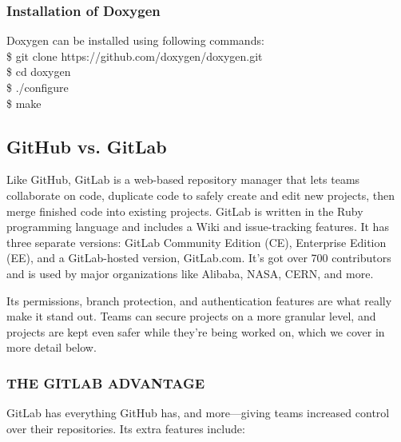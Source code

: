 \subsubsection{Installation of Doxygen}
Doxygen can be installed using following commands:\\

\hspace{4pt} \$ git clone https://github.com/doxygen/doxygen.git\\ 

\hspace{4pt} \$ cd doxygen\\

\hspace{4pt} \$ ./configure\\

\hspace{4pt} \$ make \\

\subsection{GitHub vs. GitLab}
Like GitHub, GitLab is a web-based repository manager that lets teams collaborate on code, duplicate code to safely create and edit new projects, then merge finished code into existing projects. GitLab is written in the Ruby programming language and includes a Wiki and issue-tracking features. It has three separate versions: GitLab Community Edition (CE), Enterprise Edition (EE), and a GitLab-hosted version, GitLab.com. It’s got over 700 contributors and is used by major organizations like Alibaba, NASA, CERN, and more.

Its permissions, branch protection, and authentication features are what really make it stand out. Teams can secure projects on a more granular level, and projects are kept even safer while they’re being worked on, which we cover in more detail below.

\subsubsection{THE GITLAB ADVANTAGE}
	
	GitLab has everything GitHub has, and more—giving teams increased control over their repositories. Its extra features include:
	
